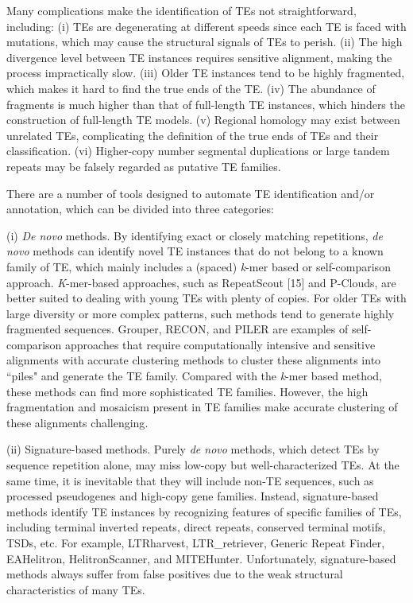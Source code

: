 \documentclass{bmcart}
\begin{document}
Many complications make the identification of TEs not straightforward, including: (i) TEs are degenerating at different speeds since each TE is faced with mutations, which may cause the structural signals of TEs to perish. (ii) The high divergence level between TE instances requires sensitive alignment, making the process impractically slow. (iii) Older TE instances tend to be highly fragmented, which makes it hard to find the true ends of the TE. (iv) The abundance of fragments is much higher than that of full-length TE instances, which hinders the construction of full-length TE models. (v) Regional homology may exist between unrelated TEs, complicating the definition of the true ends of TEs and their classification. (vi) Higher-copy number segmental duplications or large tandem repeats may be falsely regarded as putative TE families\cite{storer2022methodologies}.

There are a number of tools designed to automate TE identification and/or annotation, which can be divided into three categories:

(i) \emph{De novo} methods. By identifying exact or closely matching repetitions, \emph{de novo} methods can identify novel TE instances that do not belong to a known family of TE, which mainly includes a (spaced) \emph{k}-mer based or self-comparison approach. \emph{K}-mer-based approaches, such as RepeatScout [15] and P-Clouds\cite{gu2008identification}, are better suited to dealing with young TEs with plenty of copies. For older TEs with large diversity or more complex patterns, such methods tend to generate highly fragmented sequences. Grouper\cite{quesneville2003detection}, RECON\cite{bao2002automated}, and PILER\cite{edgar2005piler} are examples of self-comparison approaches that require computationally intensive and sensitive alignments with accurate clustering methods to cluster these alignments into ``piles" and generate the TE family. Compared with the \emph{k}-mer based method, these methods can find more sophisticated TE families. However, the high fragmentation and mosaicism present in TE families make accurate clustering of these alignments challenging\cite{storer2022methodologies}.

(ii) Signature-based methods. Purely \emph{de novo} methods, which detect TEs by sequence repetition alone, may miss low-copy but well-characterized TEs. At the same time, it is inevitable that they will include non-TE sequences, such as processed pseudogenes and high-copy gene families. Instead, signature-based methods identify TE instances by recognizing features of specific families of TEs, including terminal inverted repeats, direct repeats, conserved terminal motifs, TSDs, etc. For example, LTRharvest\cite{ellinghaus2008ltrharvest}, LTR\_retriever\cite{ou2018ltr_retriever}, Generic Repeat Finder\cite{shi2019generic}, EAHelitron\cite{hu2019helitron}, HelitronScanner\cite{xiong2014helitronscanner}, and MITEHunter. Unfortunately, signature-based methods always suffer from false positives due to the weak structural characteristics of many TEs.
\end{document}
